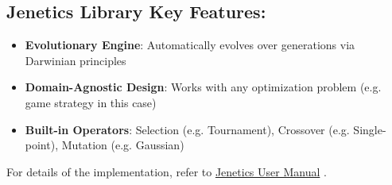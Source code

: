 \documentclass[sigconf]{acmart} %
\begin{document}
\subsection{Jenetics Library Key Features:}
\begin{itemize}
    \item \textbf{Evolutionary Engine}: Automatically evolves over generations via Darwinian principles
    \item \textbf{Domain-Agnostic Design}: Works with any optimization problem (e.g. game strategy in this case)
    \item \textbf{Built-in Operators}: Selection (e.g. Tournament), Crossover (e.g. Single-point), Mutation (e.g. Gaussian)
\end{itemize}
For details of the implementation, refer to \href{https://jenetics.io/manual/manual-8.2.0.pdf}{Jenetics User Manual} \cite{jenetics2024}.
\end{document}
